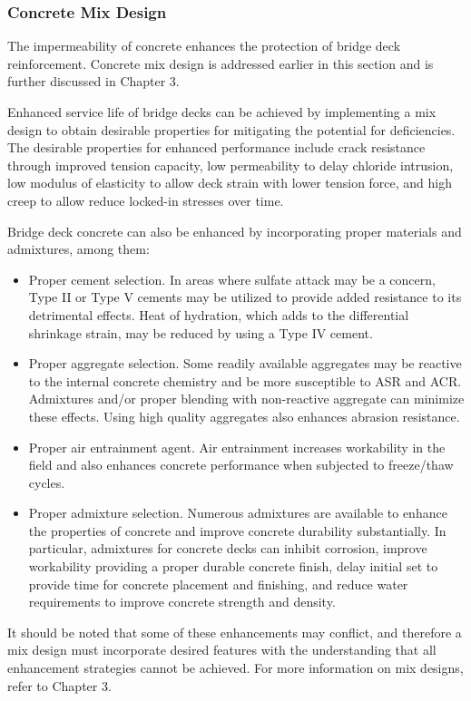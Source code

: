 \subsubsection{Concrete Mix Design}
The impermeability of concrete enhances the protection of bridge deck reinforcement. Concrete mix design is
addressed earlier in this section and is further discussed in Chapter 3.

Enhanced service life of bridge decks can be achieved by implementing a mix design to obtain desirable
properties for mitigating the potential for deficiencies. The desirable properties for enhanced performance include
crack resistance through improved tension capacity, low permeability to delay chloride intrusion, low modulus of
elasticity to allow deck strain with lower tension force, and high creep to allow reduce locked-in stresses over time.

Bridge deck concrete can also be enhanced by incorporating proper materials and admixtures, among them:
\begin{itemize}
  \item Proper cement selection. In areas where sulfate attack may be a concern, Type II or Type V cements may be
  utilized to provide added resistance to its detrimental effects. Heat of hydration, which adds to the
  differential shrinkage strain, may be reduced by using a Type IV cement.
  \item Proper aggregate selection. Some readily available aggregates may be reactive to the internal concrete
  chemistry and be more susceptible to ASR and ACR. Admixtures and/or proper blending with non-reactive
  aggregate can minimize these effects. Using high quality aggregates also enhances abrasion resistance.
  \item Proper air entrainment agent. Air entrainment increases workability in the field and also enhances concrete
  performance when subjected to freeze/thaw cycles.
  \item Proper admixture selection. Numerous admixtures are available to enhance the properties of concrete and
  improve concrete durability substantially. In particular, admixtures for concrete decks can inhibit corrosion,
  improve workability providing a proper durable concrete finish, delay initial set to provide time for concrete
  placement and finishing, and reduce water requirements to improve concrete strength and density.
\end{itemize}

It should be noted that some of these enhancements may conflict, and therefore a mix design must incorporate
desired features with the understanding that all enhancement strategies cannot be achieved. For more information on
mix designs, refer to Chapter 3.


